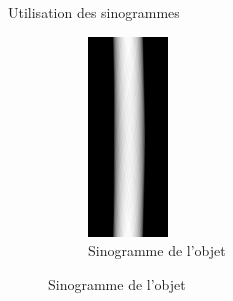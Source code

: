 \documentclass{beamer}
\begin{document}
\begin{frame}{Utilisation des sinogrammes}
\begin{figure}[t]
\begin{subfigure}[b]{0.2\textwidth}
            \includegraphics[width=\textwidth]{sino_rond.png}
            \caption{Sinogramme de l'objet}
        \end{subfigure}
    \end{figure}
\end{frame}
\end{document}
